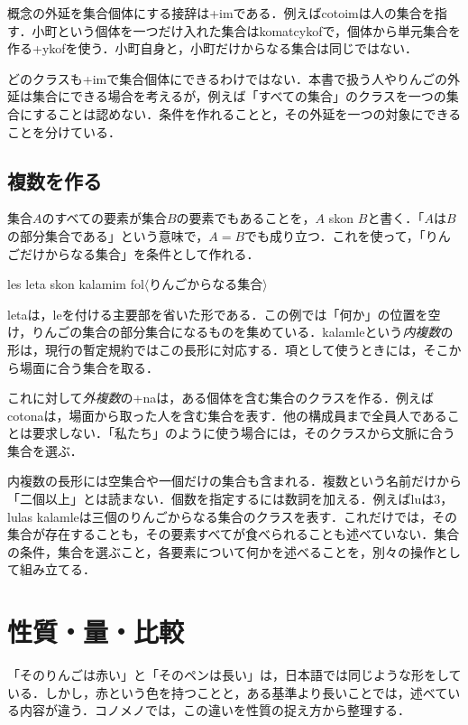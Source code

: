 \documentclass[b5paper, 10pt]{ltjsarticle}
\newcommand{\ko}[1]{\textsf{#1}}
\newcommand{\sentence}[1]{$\langle$#1$\rangle$}
\begin{document}
概念の外延を集合個体にする接辞は\ko{+im}である．例えば\ko{cotoim}は人の集合を指す．小町という個体を一つだけ入れた集合は\ko{komatcykof}で，個体から単元集合を作る\ko{+ykof}を使う．小町自身と，小町だけからなる集合は同じではない．

\begin{remark}
    どのクラスも\ko{+im}で集合個体にできるわけではない．本書で扱う人やりんごの外延は集合にできる場合を考えるが，例えば「すべての集合」のクラスを一つの集合にすることは認めない．条件を作れることと，その外延を一つの対象にできることを分けている．
\end{remark}

\subsection{複数を作る}
集合$A$のすべての要素が集合$B$の要素でもあることを，\ko{$A$ skon $B$}と書く．「$A$は$B$の部分集合である」という意味で，$A=B$でも成り立つ．これを使って，「りんごだけからなる集合」を条件として作れる．
\begin{exe}
    \ex \ko{les leta skon kalamim fol}\hfill \sentence{りんごからなる集合}
\end{exe}
\ko{leta}は，\ko{le}を付ける主要部を省いた形である．この例では「何か」の位置を空け，りんごの集合の部分集合になるものを集めている．\ko{kalamle}という\emph{内複数}の形は，現行の暫定規約ではこの長形に対応する．項として使うときには，そこから場面に合う集合を取る．

これに対して\emph{外複数}の\ko{+na}は，ある個体を含む集合のクラスを作る．例えば\ko{cotona}は，場面から取った人を含む集合を表す．他の構成員まで全員人であることは要求しない．「私たち」のように使う場合には，そのクラスから文脈に合う集合を選ぶ．

内複数の長形には空集合や一個だけの集合も含まれる．複数という名前だけから「二個以上」とは読まない．個数を指定するには数詞を加える．例えば\ko{lu}は3，\ko{lulas kalamle}は三個のりんごからなる集合のクラスを表す．これだけでは，その集合が存在することも，その要素すべてが食べられることも述べていない．集合の条件，集合を選ぶこと，各要素について何かを述べることを，別々の操作として組み立てる．

\section{性質・量・比較}
「そのりんごは赤い」と「そのペンは長い」は，日本語では同じような形をしている．しかし，赤という色を持つことと，ある基準より長いことでは，述べている内容が違う．コノメノでは，この違いを性質の捉え方から整理する．
\end{document}
